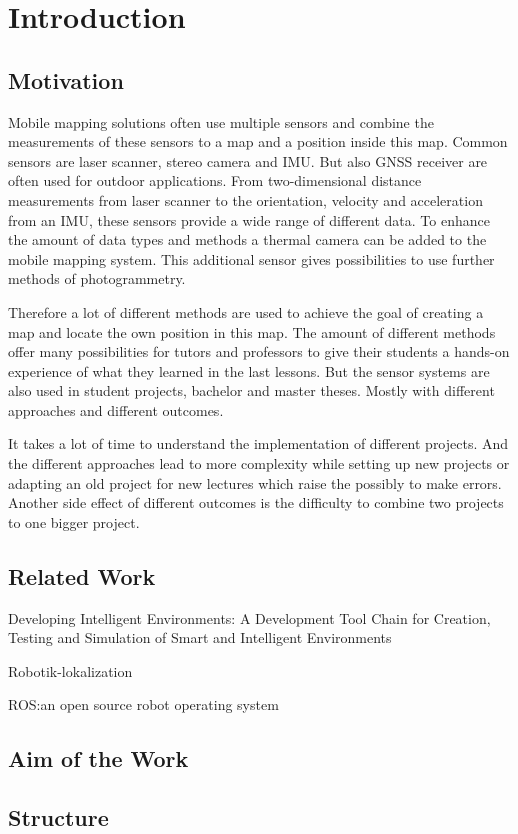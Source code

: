 \chapter{Introduction}\label{ch:introduction}

\section{Motivation}\label{sec:motivation}

Mobile mapping solutions often use multiple sensors and combine the measurements of these sensors to a map and a position inside this map.
Common sensors are laser scanner, stereo camera and \ac{IMU}.
But also \ac{GNSS} receiver are often used for outdoor applications.
From two-dimensional distance measurements from laser scanner to the orientation, velocity and acceleration from an \ac{IMU}, these sensors provide a wide range of different data.
To enhance the amount of data types and methods a thermal camera can be added to the mobile mapping system.
This additional sensor gives possibilities to use further methods of photogrammetry.

Therefore a lot of different methods are used to achieve the goal of creating a map and locate the own position in this map.
The amount of different methods offer many possibilities for tutors and professors to give their students a hands-on experience of what they learned in the last lessons.
But the sensor systems are also used in student projects, bachelor and master theses.
Mostly with different approaches and different outcomes.

It takes a lot of time to understand the implementation of different projects.
And the different approaches lead to more complexity while setting up new projects or adapting an old project for new lectures which raise the possibly to make errors.
Another side effect of different outcomes is the difficulty to combine two projects to one bigger project.

\section{Related Work}\label{sec:related-work}
Developing Intelligent Environments: A Development Tool Chain for Creation, Testing and Simulation of Smart and Intelligent Environments\cite{roalter2011developing}

Robotik-lokalization\cite{MooreStouchKeneralizedEkf2014}

ROS:\@ an open source robot operating system\cite{Quigley2009ROSAO}

\section{Aim of the Work}\label{sec:aimOfTheWork}
\section{Structure}\label{sec:structure}

